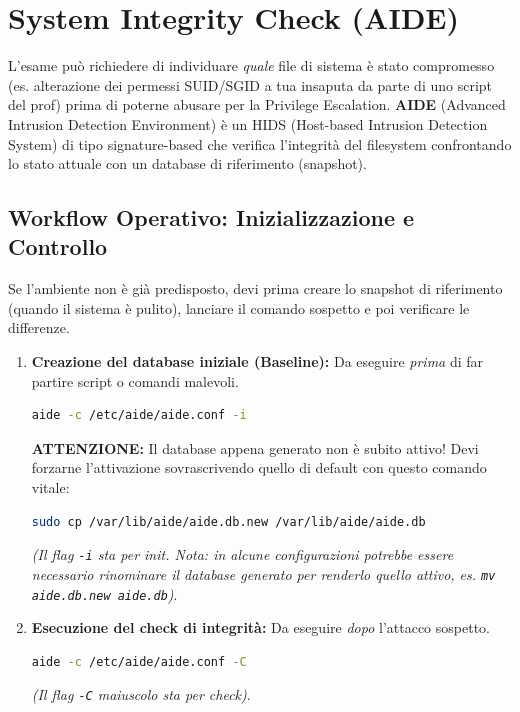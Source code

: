 \documentclass[12pt,a4paper]{report}
\begin{document}
	\section{System Integrity Check (AIDE)}
	L'esame può richiedere di individuare \textit{quale} file di sistema è stato compromesso (es. alterazione dei permessi SUID/SGID a tua insaputa da parte di uno script del prof) prima di poterne abusare per la Privilege Escalation. \textbf{AIDE} (Advanced Intrusion Detection Environment) è un HIDS (Host-based Intrusion Detection System) di tipo signature-based che verifica l'integrità del filesystem confrontando lo stato attuale con un database di riferimento (snapshot).
	
	\subsection{Workflow Operativo: Inizializzazione e Controllo}
	Se l'ambiente non è già predisposto, devi prima creare lo snapshot di riferimento (quando il sistema è pulito), lanciare il comando sospetto e poi verificare le differenze.
	
	\begin{enumerate}
		\item \textbf{Creazione del database iniziale (Baseline):}
		Da eseguire \textit{prima} di far partire script o comandi malevoli.
		\begin{lstlisting}[language=bash]
			aide -c /etc/aide/aide.conf -i
		\end{lstlisting}
		\textbf{ATTENZIONE:} Il database appena generato non è subito attivo! Devi forzarne l'attivazione sovrascrivendo quello di default con questo comando vitale:
		\begin{lstlisting}[language=bash]
			sudo cp /var/lib/aide/aide.db.new /var/lib/aide/aide.db
		\end{lstlisting}
		\textit{(Il flag \texttt{-i} sta per init. Nota: in alcune configurazioni potrebbe essere necessario rinominare il database generato per renderlo quello attivo, es. \texttt{mv aide.db.new aide.db})}.
		
		\item \textbf{Esecuzione del check di integrità:}
		Da eseguire \textit{dopo} l'attacco sospetto.
		\begin{lstlisting}[language=bash]
			aide -c /etc/aide/aide.conf -C
		\end{lstlisting}
		\textit{(Il flag \texttt{-C} maiuscolo sta per check)}.
	\end{enumerate}
	
\end{document}
